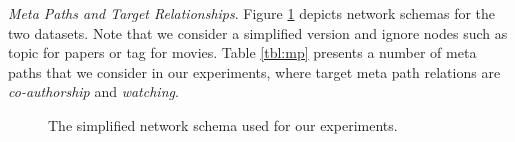 \textit{Meta Paths and Target Relationships}. Figure \ref{Fig:expSchema} depicts network schemas for the two datasets. Note that we consider a simplified version and ignore nodes such as topic for papers or tag for movies. Table \ref{tbl:mp} presents a number of meta paths that we consider in our experiments, where target meta path relations are \textit{co-authorship} and \textit{watching}. 


\begin{figure}[t]
\centering
{}
\caption{The simplified network schema used for our experiments.} \label{Fig:expSchema}
\end{figure}


